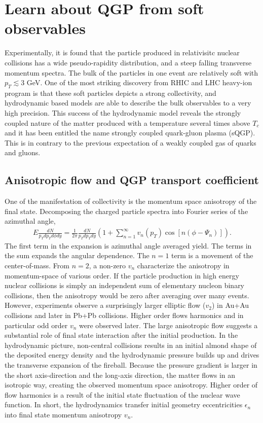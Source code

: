 \section{Learn about QGP from soft observables}
Experimentally, it is found that the particle produced in relativisitc nuclear collisions has a wide pseudo-rapidity distribution, and a steep falling transverse momentum spectra.
The bulk of the particles in one event are relatively soft with $p_T \lesssim 3$ GeV.
One of the most striking discovery from RHIC and LHC heavy-ion program is that these soft particles depicts a strong collectivity, and hydrodynamic based models are able to describe the bulk observables to a very high precision.
This success of the hydrodynamic model reveals the strongly coupled nature of the matter produced with a temperature several times above $T_c$ and it has been entitled the name strongly coupled quark-gluon plasma (sQGP).
This is in contrary to the previous expectation of a weakly coupled gas of quarks and gluons.

\subsection{Anisotropic flow and QGP transport coefficient} 
One of the manifestation of collectivity is the momentum space anisotropy of the final state. 
Decomposing the charged particle spectra into Fourier series of the azimuthal angle,
\begin{eqnarray}
E\frac{dN}{p_T dp_T d\phi dy} = \frac{1}{2\pi}\frac{dN}{p_T dp_T dy}\left(1 + \sum_{n=1}^{\infty}v_n(p_T)\cos\left[n(\phi-\Psi_n)\right]\right).
\end{eqnarray}
The first term in the expansion is azimuthal angle averaged yield.
The terms in the sum expands the angular dependence. 
The $n=1$ term is a movement of the center-of-mass.
From $n=2$, a non-zero $v_n$ characterize the anisotropy in momentum-space of various order.
If the particle production in high energy nuclear collisions is simply an independent sum of elementary nucleon binary collisions, then the anisotropy would be zero after averaging over many events. 
However, experiments observe a surprisingly larger elliptic flow ($v_2$) in Au+Au collisions and later in Pb+Pb collisions.
Higher order flows harmonics and in particular odd order $v_n$ were observed later.
The large anisotropic flow suggests a substantial role of final state interaction after the initial production.
In the hydrodynamic picture, non-central collisions results in an initial almond shape of the deposited energy density and the hydrodynamic pressure builds up and drives the transverse expansion of the fireball.
Because the pressure gradient is larger in the short axis-direction and the long-axis direction, the matter flows in an isotropic way, creating the observed momentum space anisotropy.
Higher order of flow harmonics is a result of the initial state fluctuation of the nuclear wave function.
In short, the hydrodynamics transfer initial geometry eccentricities $\epsilon_n$ into final state momentum anisotropy $v_n$.

